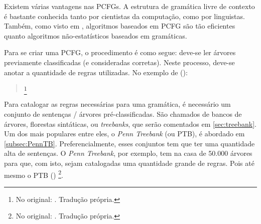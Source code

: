 Existem várias vantagens nas PCFGs. A estrutura de gramática livre de contexto é bastante conhecida tanto por cientistas da computação, como por linguistas. Também, como visto em  \cite[p~38]{charniak97statistical}, algoritmos baseados em PCFG são tão eficientes quanto algoritmos não-estatísticos baseados em gramáticas.

Para se criar uma PCFG, o procedimento é como segue: deve-se ler árvores previamente classificadas (e consideradas corretas). Neste processo, deve-se anotar a quantidade de regras utilizadas. No exemplo de (\textit{}):
\begin{quote}
    \footnote{No original: . Tradução própria.}
\end{quote}
Para catalogar as regras necessárias para uma gramática, é necessário um conjunto de sentenças / árvores pré-classificadas. São chamados de bancos de árvores, florestas sintáticas, ou \textit{treebanks}, que serão comentados em \ref{sec:treebank}. Um dos mais populares entre eles, o \textit{Penn Treebank} (ou PTB), é abordado em \ref{subsec:PennTB}. Preferencialmente, esses conjuntos tem que ter uma quantidade alta de sentenças. O  \textit{Penn Treebank}, por exemplo, tem na casa de 50.000 árvores para que, com isto, sejam catalogadas uma quantidade grande de regras. Pois até mesmo o PTB (\textit{}) 
\footnote{No original: . Tradução própria.}.

